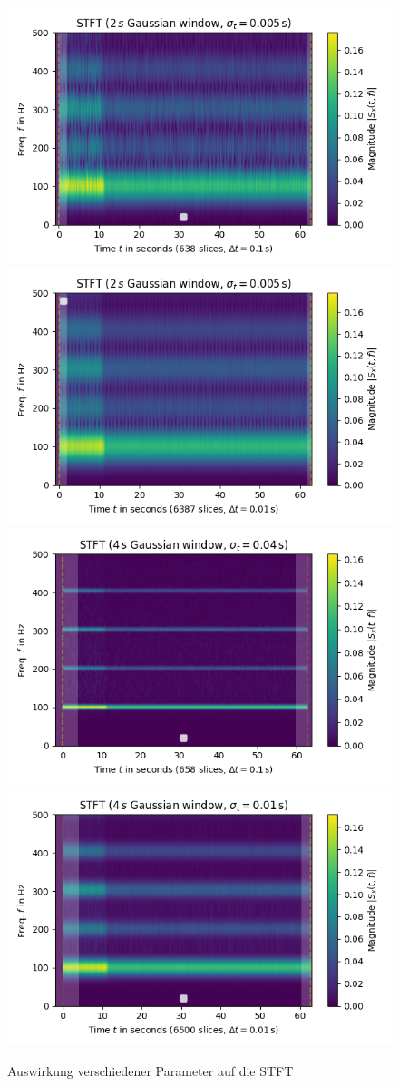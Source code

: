 \begin{figure}[H]
    \includegraphics[width=0.5\linewidth]{Studienarbeit//images/2sr-1_400-sr_10.png}    
    \includegraphics[width=0.5\linewidth]{Studienarbeit//images/2sr-1_400-sr_100.png}
    \includegraphics[width=0.5\linewidth]{Studienarbeit//images/4sr-1_100-sr_10.png}
    \includegraphics[width=0.5\linewidth]{Studienarbeit//images/4sr-1_400-sr_100.png}
    \caption{Auswirkung verschiedener Parameter auf die STFT}
    \label{fig:parameter-stft}
\end{figure}

